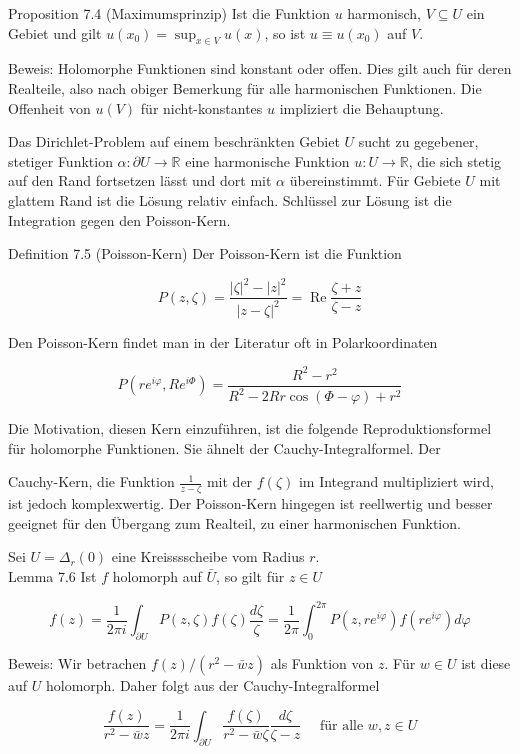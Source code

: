 \documentclass[10pt, letterpaper]{article}
\begin{document}
Proposition 7.4 (Maximumsprinzip) Ist die Funktion $u$ harmonisch, $V \subseteq U$ ein Gebiet und gilt $u\left(x_{0}\right)=\sup _{x \in V} u(x)$, so ist $u \equiv u\left(x_{0}\right)$ auf $V$.

Beweis: Holomorphe Funktionen sind konstant oder offen. Dies gilt auch für deren Realteile, also nach obiger Bemerkung für alle harmonischen Funktionen. Die Offenheit von $u(V)$ für nicht-konstantes $u$ impliziert die Behauptung.

Das Dirichlet-Problem auf einem beschränkten Gebiet $U$ sucht zu gegebener, stetiger Funktion $\alpha: \partial U \rightarrow \mathbb{R}$ eine harmonische Funktion $u: U \rightarrow \mathbb{R}$, die sich stetig auf den Rand fortsetzen lässt und dort mit $\alpha$ übereinstimmt. Für Gebiete $U$ mit glattem Rand ist die Lösung relativ einfach. Schlüssel zur Lösung ist die Integration gegen den Poisson-Kern.

Definition 7.5 (Poisson-Kern) Der Poisson-Kern ist die Funktion

$$
P(z, \zeta)=\frac{|\zeta|^{2}-|z|^{2}}{|z-\zeta|^{2}}=\operatorname{Re} \frac{\zeta+z}{\zeta-z}
$$

Den Poisson-Kern findet man in der Literatur oft in Polarkoordinaten

$$
P\left(r e^{i \varphi}, R e^{i \Phi}\right)=\frac{R^{2}-r^{2}}{R^{2}-2 R r \cos (\Phi-\varphi)+r^{2}}
$$

Die Motivation, diesen Kern einzuführen, ist die folgende Reproduktionsformel für holomorphe Funktionen. Sie ähnelt der Cauchy-Integralformel. Der

Cauchy-Kern, die Funktion $\frac{1}{z-\zeta}$ mit der $f(\zeta)$ im Integrand multipliziert wird, ist jedoch komplexwertig. Der Poisson-Kern hingegen ist reellwertig und besser geeignet für den Übergang zum Realteil, zu einer harmonischen Funktion.

Sei $U=\Delta_{r}(0)$ eine Kreisssscheibe vom Radius $r$.\\
Lemma 7.6 Ist $f$ holomorph auf $\bar{U}$, so gilt für $z \in U$

$$
f(z)=\frac{1}{2 \pi i} \int_{\partial U} P(z, \zeta) f(\zeta) \frac{d \zeta}{\zeta}=\frac{1}{2 \pi} \int_{0}^{2 \pi} P\left(z, r e^{i \varphi}\right) f\left(r e^{i \varphi}\right) d \varphi
$$

Beweis: Wir betrachen $f(z) /\left(r^{2}-\bar{w} z\right)$ als Funktion von $z$. Für $w \in U$ ist diese auf $U$ holomorph. Daher folgt aus der Cauchy-Integralformel

$$
\frac{f(z)}{r^{2}-\bar{w} z}=\frac{1}{2 \pi i} \int_{\partial U} \frac{f(\zeta)}{r^{2}-\bar{w} \zeta} \frac{d \zeta}{\zeta-z} \quad \text { für alle } w, z \in U
$$
\end{document}
